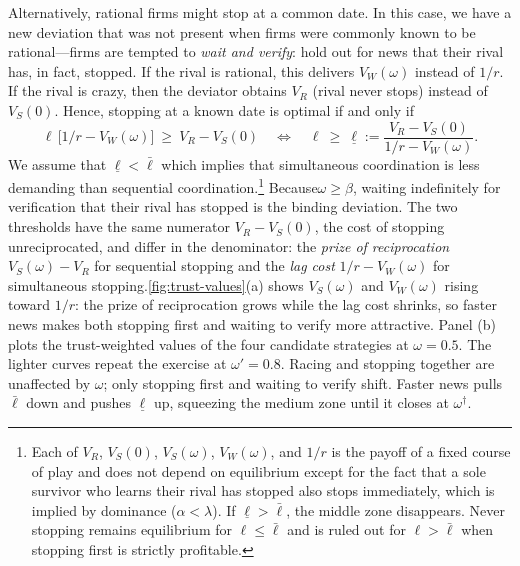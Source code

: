 \documentclass[12pt,reqno]{article}
\theoremstyle{definition} \newtheorem{example}{Example}
\theoremstyle{definition} \newtheorem{condition}{Condition}
\theoremstyle{definition} \newtheorem{corollary}{Corollary}
\theoremstyle{definition} \newtheorem{claim}{Claim}
\theoremstyle{definition} \newtheorem{definition}{Definition}
\theoremstyle{definition} \newtheorem{conjecture}{Conjecture}
\theoremstyle{definition} \newtheorem{Lemma}{Lemma}
\theoremstyle{definition} \newtheorem{lemma}{Lemma}
\theoremstyle{plain} \newtheorem{theorem}{Theorem}
\theoremstyle{definition} \newtheorem{assumption}{Assumption}
\theoremstyle{definition} \newtheorem*{assumptionnonumber}{Assumption}
\theoremstyle{definition} \newtheorem*{theoremNoNumber}{Proposition}
\theoremstyle{definition}
\theoremstyle{definition}\newtheorem{proposition}{Proposition}
\theoremstyle{definition} \newtheorem{result}{Result}
\theoremstyle{definition} \newtheorem*{definitionNoNumber}{Definition}
\theoremstyle{definition} \newtheorem{Definition}{Definition}
\theoremstyle{definition} \newtheorem*{DefinitionNoNumber}{Definition}
\theoremstyle{definition} \newtheorem*{fact}{Fact}
\theoremstyle{definition} \newtheorem*{property}{Property}
\theoremstyle{definition} \newtheorem{remark}{Remark}
\begin{document}
Alternatively, rational firms might stop at a common date. In this case, we have a new deviation that was not present when firms were commonly known to be rational---firms are tempted to \emph{wait and verify}: hold out for news that their rival has, in fact, stopped. If the rival is rational, this delivers $V_W(\omega)$ instead of $1/r$. If the rival is crazy, then the deviator obtains $V_R$ (rival never stops) instead of $V_S(0)$. Hence, stopping at a known date is optimal if and only if
\[
\ell\,\big[1/r-V_W(\omega)\big]\ \ge\ V_R-V_S(0)
\quad\Longleftrightarrow\quad
\ell\ \ge\ \underline\ell:=\frac{V_R-V_S(0)}{1/r-V_W(\omega)}.
\]
 We assume that $\underline\ell<\bar\ell$ which implies that simultaneous coordination is less demanding than sequential coordination.\footnote{Each of $V_R$, $V_S(0)$, $V_S(\omega)$, $V_W(\omega)$, and $1/r$ is the payoff of a fixed course of play and does not depend on equilibrium except for the fact that a sole survivor who learns their rival has stopped also stops immediately, which is implied by dominance ($\alpha<\lambda$). If $\underline \ell > \bar \ell$,  the middle zone disappears. Never stopping remains equilibrium for $\ell \leq \bar \ell$ and is ruled out for $\ell > \bar \ell$ when stopping first is strictly profitable.} Because$\omega \geq \beta$, waiting indefinitely for verification that their rival has stopped is the binding deviation. The two thresholds have the same  numerator $V_R - V_S(0)$, the cost of stopping 
unreciprocated, and differ in the denominator: the \emph{prize of 
reciprocation} $V_S(\omega)-V_R$ for sequential stopping and the \emph{lag 
cost} $1/r - V_W(\omega)$ for simultaneous stopping.\cref{fig:trust-values}(a) 
shows $V_S(\omega)$ and $V_W(\omega)$ rising toward $1/r$: the prize of 
reciprocation grows while the lag cost shrinks, so faster news makes both 
stopping first and waiting to verify more attractive. Panel (b) plots the 
trust-weighted values of the four candidate strategies at $\omega=0.5$. The lighter 
curves repeat the exercise at $\omega'=0.8$. Racing and stopping together are 
unaffected by $\omega$; only stopping first and waiting to verify shift. Faster 
news pulls $\bar\ell$ down and pushes $\underline\ell$ up, squeezing the medium 
zone until it closes at $\omega^{\dagger}$.
\end{document}
